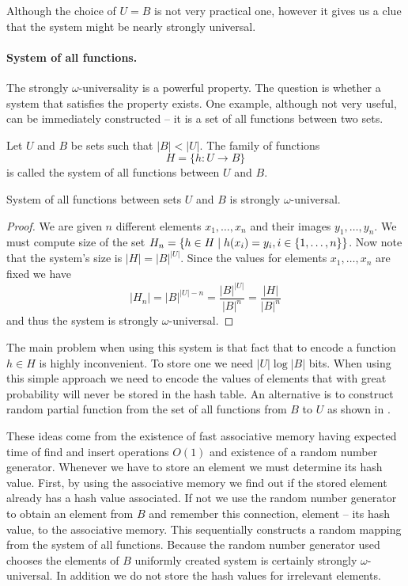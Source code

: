 Although the choice of $U = B$ is not very practical one, however it gives us a clue that the system might be nearly strongly universal.

\paragraph{System of all functions.}
The strongly $\omega$-universality is a powerful property. The question is whether a system that satisfies the property exists. One example, although not very useful, can be immediately constructed -- it is a set of all functions between two sets.

\begin{definition}
Let $U$ and $B$ be sets such that $|B| < |U|$. The family of functions
\[
H = \{h: U \rightarrow B \}
\]
is called the system of all functions between $U$ and $B$.
\end{definition}

\begin{remark}
System of all functions between sets $U$ and $B$ is strongly $\omega$-universal.
\end{remark}
\begin{proof}
We are given $n$ different elements $x_1, \dots, x_n$ and their images $y_1, \dots, y_n$. We must compute size of the set $H_n = \lbrace h \in H \mid h(x_i) = y_i, i \in \lbrace 1, \dots, n\rbrace \rbrace$. Now note that the system's size is $|H| = {|B|}^{|U|}$. Since the values for elements $x_1, \dots, x_n$ are fixed we have \[ |H_n| = {|B|}^{|U| - n} = \frac{{|B|}^{|U|}}{{|B|}^{n}} = \frac{|H|}{|B|^n} \] and thus the system is strongly $\omega$-universal.
\end{proof}

The main problem when using this system is that fact that to encode a function $h \in H$ is highly inconvenient. To store one we need $|U| \log |B|$ bits. When using this simple approach we need to encode the values of elements that with great probability will never be stored in the hash table. An alternative is to construct random partial function from the set of all functions from $B$ to $U$ as shown in \cite{1382617}. 

These ideas come from the existence of fast associative memory having expected time of find and insert operations $O(1)$ and existence of a random number generator. Whenever we have to store an element we must determine its hash value. First, by using the associative memory we find out if the stored element already has a hash value associated. If not we use the random number generator to obtain an element from $B$ and remember this connection, element -- its hash value, to the associative memory. This sequentially constructs a random mapping from the system of all functions. Because the random number generator used chooses the elements of $B$ uniformly created system is certainly strongly $\omega$-universal. In addition we do not store the hash values for irrelevant elements. 

